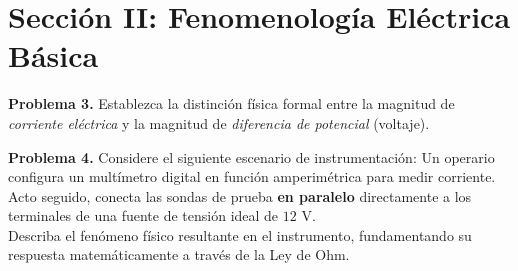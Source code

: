 \documentclass[11pt, a4paper]{article}
\begin{document}
\vspace{3.5cm}

\section*{Sección II: Fenomenología Eléctrica Básica}

\textbf{Problema 3.} Establezca la distinción física formal entre la magnitud de \textit{corriente eléctrica} y la magnitud de \textit{diferencia de potencial} (voltaje).

\vspace{3.5cm}

\textbf{Problema 4.} Considere el siguiente escenario de instrumentación: Un operario configura un multímetro digital en función amperimétrica para medir corriente. Acto seguido, conecta las sondas de prueba \textbf{en paralelo} directamente a los terminales de una fuente de tensión ideal de $12\text{ V}$. 
\\
Describa el fenómeno físico resultante en el instrumento, fundamentando su respuesta matemáticamente a través de la Ley de Ohm.
\end{document}
